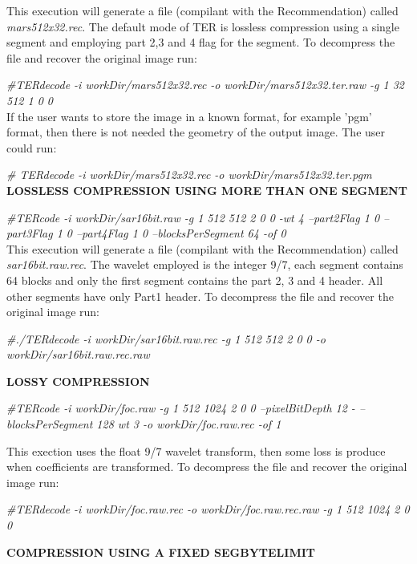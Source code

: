 \documentclass[a4paper,10pt]{article}
\begin{document}
This execution will generate a file (compilant with the
Recommendation) called \emph{mars512x32.rec}. The default mode of TER
is lossless compression using a single segment and employing part 2,3
and 4 flag for the segment. To decompress the file and recover the
original image run:

\emph{\#TERdecode -i workDir/mars512x32.rec -o
  workDir/mars512x32.ter.raw -g 1 32 512 1 0 0 } \\   

If the user wants to store the image in a known format, for example
'pgm' format, then there is not needed the geometry of the output
image. The user could run:

\emph{\# TERdecode -i workDir/mars512x32.rec -o
  workDir/mars512x32.ter.pgm} \\ 

\vspace{0.25cm}\textbf{LOSSLESS COMPRESSION USING MORE THAN ONE
  SEGMENT}\vspace{0.25cm}  
		
\emph{\#TERcode -i workDir/sar16bit.raw -g 1 512 512 2 0 0 -wt 4
  --part2Flag 1 0 --part3Flag 1 0 --part4Flag 1 0 --blocksPerSegment
  64 -of 0} \\    
		
This execution will generate a file (compilant with the
Recommendation) called \emph{sar16bit.raw.rec}. The wavelet employed
is the integer 9/7, each segment contains 64 blocks and only the first
segment contains the part 2, 3 and 4 header. All other segments have
only Part1 header. To decompress the file and recover the original
image run: 

\emph{\#./TERdecode -i workDir/sar16bit.raw.rec -g 1 512 512 2 0 0 -o
  workDir/sar16bit.raw.rec.raw} 


\vspace{0.25cm}\textbf{LOSSY COMPRESSION}\vspace{0.25cm}

\emph{\#TERcode -i workDir/foc.raw -g 1 512 1024 2 0 0 --pixelBitDepth
  12 - --blocksPerSegment 128 wt 3 -o workDir/foc.raw.rec -of 1}

This exection uses the float 9/7 wavelet transform, then some loss is
produce when coefficients are transformed. To decompress the file and
recover the original image run:

\emph{\#TERdecode -i workDir/foc.raw.rec -o workDir/foc.raw.rec.raw
  -g 1 512 1024 2 0 0}  


\vspace{0.25cm}\textbf{COMPRESSION USING A FIXED SEGBYTELIMIT}\vspace{0.25cm}  
\end{document}
